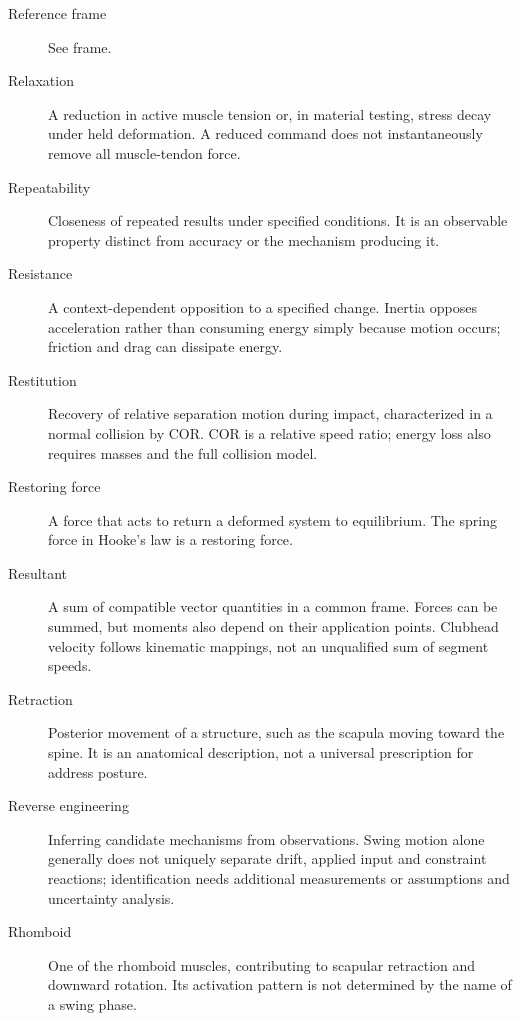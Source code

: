 \begin{description}
\item[Reference frame] See frame.

\item[Relaxation] A reduction in active muscle tension or, in material testing, stress decay under held deformation. A reduced command does not instantaneously remove all muscle-tendon force.

\item[Repeatability] Closeness of repeated results under specified conditions. It is an observable property distinct from accuracy or the mechanism producing it.

\item[Resistance] A context-dependent opposition to a specified change. Inertia opposes acceleration rather than consuming energy simply because motion occurs; friction and drag can dissipate energy.

\item[Restitution] Recovery of relative separation motion during impact, characterized in a normal collision by COR. COR is a relative speed ratio; energy loss also requires masses and the full collision model.

\item[Restoring force] A force that acts to return a deformed system to equilibrium. The spring force in Hooke's law is a restoring force.

\item[Resultant] A sum of compatible vector quantities in a common frame. Forces can be summed, but moments also depend on their application points. Clubhead velocity follows kinematic mappings, not an unqualified sum of segment speeds.

\item[Retraction] Posterior movement of a structure, such as the scapula moving toward the spine. It is an anatomical description, not a universal prescription for address posture.

\item[Reverse engineering] Inferring candidate mechanisms from observations. Swing motion alone generally does not uniquely separate drift, applied input and constraint reactions; identification needs additional measurements or assumptions and uncertainty analysis.

\item[Rhomboid] One of the rhomboid muscles, contributing to scapular retraction and downward rotation. Its activation pattern is not determined by the name of a swing phase.


\end{description}
